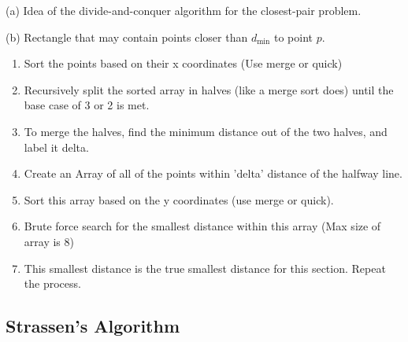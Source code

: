 {\scriptsize
(a) Idea of the divide-and-conquer algorithm for the closest-pair problem.

(b) Rectangle that may contain points closer than $d_{\text{min}}$ to point $p$.
}

\begin{enumerate}
    \item Sort the points based on their x coordinates (Use merge or quick)
    \item Recursively split the sorted array in halves (like a merge sort does) until the base case of 3 or 2 is met.
    \item To merge the halves, find the minimum distance out of the two halves, and label it delta. 
    \item Create an Array of all of the points within 'delta' distance of the halfway line.
    \item Sort this array based on the y coordinates (use merge or quick).
    \item Brute force search for the smallest distance within this array (Max size of array is 8) 
    \item This smallest distance is the true smallest distance for this section. Repeat the process.
\end{enumerate}
\subsection*{Strassen's Algorithm}
\lipsum[1][1-2]
